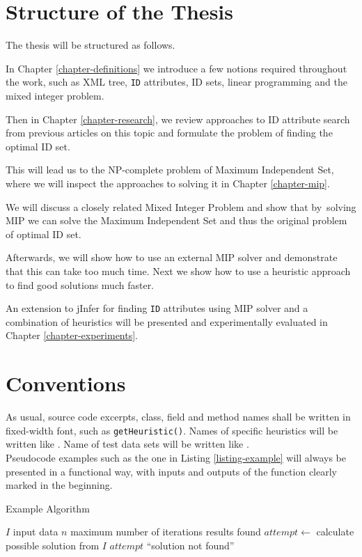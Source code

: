 \section*{Structure of the Thesis}

The thesis will be structured as follows.

In Chapter \ref{chapter-definitions} we introduce a few notions required throughout the work, such as XML tree, \texttt{ID} attributes, ID sets, linear programming and the mixed integer problem.

Then in Chapter \ref{chapter-research}, we review approaches to ID attribute search from previous articles on this topic and formulate the problem of finding the optimal ID set.

This will lead us to the NP-complete problem of Maximum Independent Set, where we will inspect the approaches to solving it in Chapter \ref{chapter-mip}.

We will discuss a closely related Mixed Integer Problem and show that by~solving MIP we can solve the Maximum Independent Set and thus the original problem of optimal ID set.

Afterwards, we will show how to use an external MIP solver and demonstrate that this can take too much time. Next we show how to use a heuristic approach to find good solutions much faster.

An extension to jInfer for finding \texttt{ID} attributes using MIP solver and a combination of heuristics will be presented and experimentally evaluated in Chapter \ref{chapter-experiments}.

\section*{Conventions}

As usual, source code excerpts, class, field and method names shall be written in fixed-width font, such as \texttt{get\-Heu\-ris\-tic()}. Names of specific heuristics will be written like . Name of test data sets will be written like .\\

Pseudocode examples such as the one in Listing \ref{listing-example} will always be presented in a functional way, with inputs and outputs of the function clearly marked in the beginning.

\begin{algorithm}
\caption{Example Algorithm}
\label{listing-example}
\begin{algorithmic}
\REQUIRE $I$ input data
\REQUIRE $n$ maximum number of iterations
\ENSURE results found
  \STATE {}
  \STATE $attempt \gets $ calculate possible solution from $I$
    \RETURN $attempt$
  \ENDIF
  \RETURN ``solution not found''
\ENDFOR
\end{algorithmic}
\end{algorithm}

